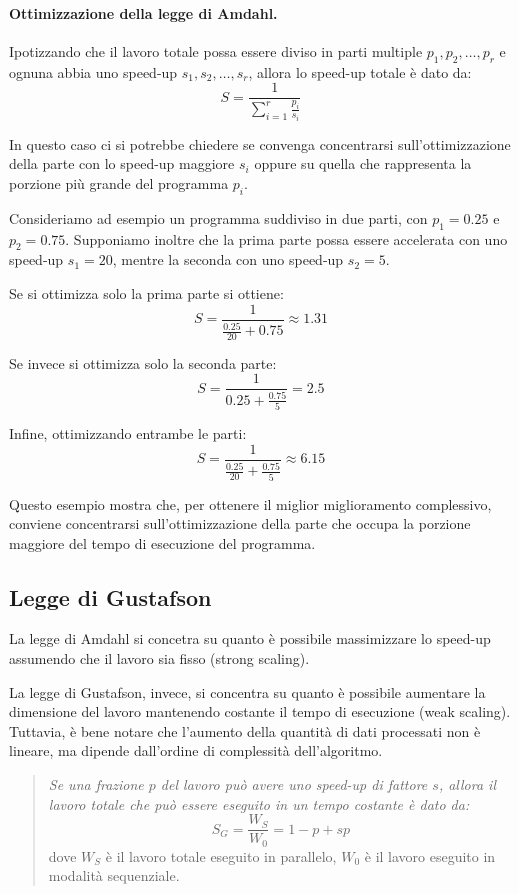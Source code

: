 \paragraph{Ottimizzazione della legge di Amdahl.}
Ipotizzando che il lavoro totale possa essere diviso in parti multiple $p_1, p_2, \dots, p_r$ e ognuna abbia uno speed-up $s_1, s_2, \dots, s_r$, allora lo speed-up totale è dato da:
\[
S = \frac{1}{\sum_{i=1}^r \frac{p_i}{s_i}}
\]

In questo caso ci si potrebbe chiedere se convenga concentrarsi sull'ottimizzazione della parte con lo speed-up maggiore $s_i$ oppure su quella che rappresenta la porzione più grande del programma $p_i$.

Consideriamo ad esempio un programma suddiviso in due parti, con $p_1 = 0.25$ e $p_2 = 0.75$. Supponiamo inoltre che la prima parte possa essere accelerata con uno speed-up $s_1 = 20$, mentre la seconda con uno speed-up $s_2 = 5$.

Se si ottimizza solo la prima parte si ottiene:
\[
S = \frac{1}{\frac{0.25}{20} + 0.75} \approx 1.31
\]

Se invece si ottimizza solo la seconda parte:
\[
S = \frac{1}{0.25 + \frac{0.75}{5}} = 2.5
\]

Infine, ottimizzando entrambe le parti:
\[
S = \frac{1}{\frac{0.25}{20} + \frac{0.75}{5}} \approx 6.15
\]

Questo esempio mostra che, per ottenere il miglior miglioramento complessivo, conviene concentrarsi sull'ottimizzazione della parte che occupa la porzione maggiore del tempo di esecuzione del programma.

\subsection{Legge di Gustafson}
La legge di Amdahl si concetra su quanto è possibile massimizzare lo speed-up assumendo che il lavoro sia fisso (strong scaling).

La legge di Gustafson, invece, si concentra su quanto è possibile aumentare la dimensione del lavoro mantenendo costante il tempo di esecuzione (weak scaling). Tuttavia, è bene notare che l'aumento della quantità di dati processati non è lineare, ma dipende dall'ordine di complessità dell'algoritmo.
\begin{quote}
\textit{Se una frazione $p$ del lavoro può avere uno speed-up di fattore $s$, allora il lavoro totale che può essere eseguito in un tempo costante è dato da:}
\[
S_G = \frac{W_S}{W_0} = 1 - p + sp 
\]
dove $W_S$ è il lavoro totale eseguito in parallelo, $W_0$ è il lavoro eseguito in modalità sequenziale.
\end{quote}

